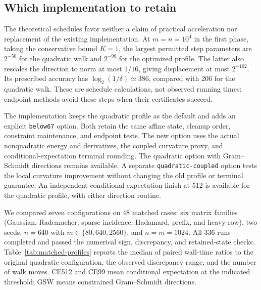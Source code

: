 \documentclass[11pt]{amsart}
\theoremstyle{definition}\newtheorem{definition}[theorem]{Definition}
\theoremstyle{remark}\newtheorem{remark}[theorem]{Remark}
\numberwithin{equation}{section}
\begin{document}
\subsection{Which implementation to retain}\label{opt:comparison}
The theoretical schedules favor neither a claim of practical acceleration
nor replacement of the existing implementation. At $m=n=10^4$ in the
first phase, taking the conservative bound $K=1$, the largest permitted
step parameters are $2^{-50}$ for the quadratic walk and $2^{-98}$ for
the optimized profile. The latter also rescales the direction to norm
at most $1/16$, giving displacement at most $2^{-102}$.
Its prescribed accuracy has $\log_2(1/\delta)\simeq386$, compared with
$206$ for the quadratic walk. These are schedule calculations, not
observed running times: endpoint methods avoid these steps when their
certificates succeed.

The implementation keeps the quadratic profile as the default and adds
an explicit \texttt{below67} option. Both retain the same affine state,
cleanup order, constraint maintenance, and endpoint tests. The new option
uses the actual nonquadratic energy and derivatives, the coupled
curvature proxy, and conditional-expectation terminal rounding. The
quadratic option with Gram--Schmidt directions remains available.
A separate \texttt{quadratic-coupled} option tests the local curvature
improvement without changing the old profile or terminal guarantee.
An independent conditional-expectation finish at 512 is available for
the quadratic profile, with either direction routine.

We compared seven configurations on 48 matched cases: six matrix families
(Gaussian, Rademacher, sparse incidence, Hadamard, prefix, and heavy-row),
two seeds, $n=640$ with $m\in\{80,640,2560\}$, and $n=m=1024$.
All 336 runs completed and passed the numerical sign, discrepancy, and
retained-state checks. Table~\ref{tab:matched-profiles} reports the median of paired wall-time
ratios to the original quadratic configuration, the observed discrepancy
range, and the number of walk moves. CE512 and CE99 mean conditional
expectation at the indicated threshold; GSW means constrained
Gram--Schmidt directions.
\end{document}

